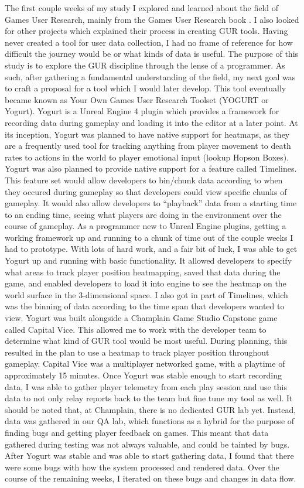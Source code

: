 \documentclass[journal]{IEEEtran}
\begin{document}
The first couple weeks of my study I explored and learned about the field of Games User Research, mainly from the Games User Research book \cite{mirza}. I also looked for other projects which explained their process in creating GUR tools. Having never created a tool for user data collection, I had no frame of reference for how difficult the journey would be or what kinds of data is useful.
The purpose of this study is to explore the GUR discipline through the lense of a programmer. As such, after gathering a fundamental understanding of the field, my next goal was to craft a proposal for a tool which I would later develop. This tool eventually became known as Your Own Games User Research Toolset (YOGURT or Yogurt). Yogurt is a Unreal Engine 4 plugin which provides a framework for recording data during gameplay and loading it into the editor at a later point. At its inception, Yogurt was planned to have native support for heatmaps, as they are a frequently used tool for tracking anything from player movement to death rates to actions in the world to player emotional input (lookup Hopson Boxes). Yogurt was also planned to provide native support for a feature called Timelines. This feature set would allow developers to bin/chunk data according to when they occured during gameplay so that developers could view specific chunks of gameplay. It would also allow developers to “playback” data from a starting time to an ending time, seeing what players are doing in the environment over the course of gameplay.
As a programmer new to Unreal Engine plugins, getting a working framework up and running to a chunk of time out of the couple weeks I had to prototype. With lots of hard work, and a fair bit of luck, I was able to get Yogurt up and running with basic functionality. It allowed developers to specify what areas to track player position heatmapping, saved that data during the game, and enabled developers to load it into engine to see the heatmap on the world surface in the 3-dimensional space. I also got in part of Timelines, which was the binning of data according to the time span that developers wanted to view.
Yogurt was built alongside a Champlain Game Studio Capstone game called Capital Vice. This allowed me to work with the developer team to determine what kind of GUR tool would be most useful. During planning, this resulted in the plan to use a heatmap to track player position throughout gameplay. Capital Vice was a multiplayer networked game, with a playtime of approximately 15 minutes. Once Yogurt was stable enough to start recording data, I was able to gather player telemetry from each play session and use this data to not only relay reports back to the team but fine tune my tool as well. It should be noted that, at Champlain, there is no dedicated GUR lab yet. Instead, data was gathered in our QA lab, which functions as a hybrid for the purpose of finding bugs and getting player feedback on games. This meant that data gathered during testing was not always valuable, and could be tainted by bugs.
After Yogurt was stable and was able to start gathering data, I found that there were some bugs with how the system processed and rendered data. Over the course of the remaining weeks, I iterated on these bugs and changes in data flow.
\end{document}
